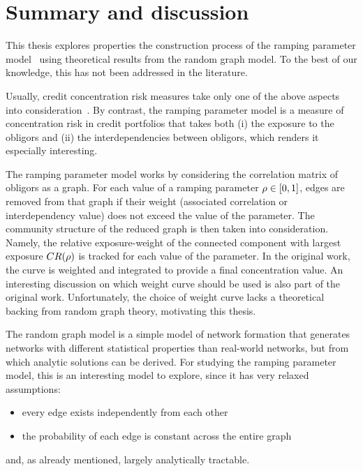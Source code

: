 \chapter{Summary and discussion} %
\label{cha:discussion}

This thesis explores properties the construction process of the ramping parameter model~\cite{Sindel:2009vd} using theoretical results from the random graph model.
To the best of our knowledge, this has not been addressed in the literature.


Usually, credit concentration risk measures take only one of the above aspects into consideration~\cite{lutkebohmert2008concentration}.
By contrast, the ramping parameter model is a measure of concentration risk in credit portfolios that takes both (i) the exposure to the obligors and (ii) the  interdependencies between obligors, which renders it especially interesting.

The ramping parameter model works by considering the correlation matrix of obligors as a graph.
For each value of a ramping parameter $\rho \in [0,1]$, edges are removed from that graph if their weight (associated correlation or interdependency value) does not exceed the value of the parameter.
The community structure of the reduced graph is then taken into consideration.
Namely, the relative exposure-weight of the connected component with largest exposure $CR(\rho)$ is tracked for each value of the parameter.
In the original work, the curve is weighted and integrated to provide a final concentration value.
An interesting discussion on which weight curve should be used is also part of the original work.
Unfortunately, the choice of weight curve lacks a theoretical backing from random graph theory, motivating this thesis.


The random graph model is a simple model of network formation that generates networks with different statistical properties than real-world networks, but from which analytic solutions can be derived.
For studying the ramping parameter model, this is an interesting model to explore, since it has very relaxed assumptions:
\begin{itemize}
\item every edge exists independently from each other
\item the probability of each edge is constant across the entire graph
\end{itemize}
and, as already mentioned, largely analytically tractable.


